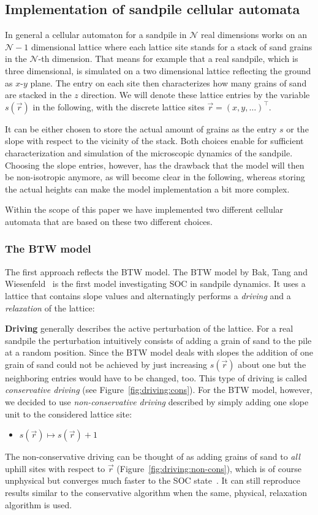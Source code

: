 \subsection{Implementation of sandpile cellular automata}
\label{sec:sandpileImplementation}
In general a cellular automaton for a sandpile in $\mathcal{N}$ real dimensions works on an $\mathcal{N}-1$ dimensional
lattice where each lattice site stands for a stack of sand grains in the $\mathcal{N}$-th dimension. That means for example that
a real sandpile, which is three dimensional, is simulated on a two dimensional lattice reflecting the ground as $x$-$y$
plane. The entry on each site then characterizes how many grains of sand are stacked in the $z$ direction.
We will denote these lattice entries by the variable $s(\vec{r})$ in the following, with the discrete lattice sites
$\vec{r}=(x,y,\ldots)^\top$.

It can be either chosen to store the actual amount of grains as the entry $s$ or the slope with respect to the
vicinity of the stack. Both choices enable for sufficient characterization and simulation of the microscopic
dynamics of the sandpile. Choosing the slope entries, however, has the drawback that the model will then be
non-isotropic anymore, as will become clear in the following, whereas storing the actual heights can make the model
implementation a bit more complex.

Within the scope of this paper we have implemented two different cellular automata that are based on these two different
choices.

\subsubsection{The BTW model}
The first approach reflects the BTW model. The BTW model by Bak, Tang and Wiesenfeld~\cite{BakTangWiesenfeld:1987}
is the first model investigating SOC in sandpile dynamics. It uses a lattice that contains slope values and
alternatingly performs a \emph{driving} and a \emph{relaxation} of the lattice:

\textbf{Driving} generally describes the active perturbation of the lattice. For a real sandpile the perturbation
intuitively consists of adding a grain of sand to the pile at a random position. Since the BTW model deals with
slopes the addition of one grain of sand could not be achieved by just increasing $s(\vec{r})$ about one but the neighboring
entries would have to be changed, too. This type of driving is called \emph{conservative driving}
(see Figure~\ref{fig:driving:cons}).
For the BTW model, however, we decided to use \emph{non-conservative driving} described by simply adding one slope
unit to the considered lattice site:
\begin{itemize}
\item $s(\vec{r}) \mapsto s(\vec{r})+1$
\end{itemize}
The non-conservative driving can be thought of as adding grains of sand to \emph{all} uphill sites with respect to
$\vec{r}$ (Figure~\ref{fig:driving:non-cons}), which is of course unphysical but converges much faster to the
SOC state~\cite{Christensen1991}. It can still reproduce results similar to the conservative algorithm when the same,
physical, relaxation algorithm is used.

